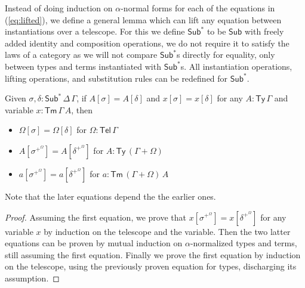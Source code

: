 \documentclass[sigplan,10pt,anonymous,review]{acmart}\settopmatter{printfolios=true,printccs=false,printacmref=false}
\newcommand{\Ty}{\mathsf{Ty}}
\newcommand{\Tm}{\mathsf{Tm}}
\newcommand{\Sub}{\mathsf{Sub}}
\newcommand{\Tel}{\mathsf{Tel}}
\begin{document}
Instead of doing induction on $\alpha$-normal forms for each of the equations in
(\ref{eq:lifted}), we define a general lemma which can lift any equation between
instantiations over a telescope. For this we define $\Sub^*$ to be $\Sub$ with
freely added identity and composition operations, we do not require it to
satisfy the laws of a category as we will not compare $\Sub^*$s directly for
equality, only between types and terms instantiated with $\Sub^*$s. All
instantiation operations, lifting operations, and substitution rules can be
redefined for $\Sub^*$.
\begin{lemma}
  \label{thm:lifting}
  Given $\sigma, \delta : \Sub^*\,\Delta\,\Gamma$, if $A[\sigma] =
  A[\delta]$ and $x[\sigma] = x[\delta]$ for any $A:\Ty\,\Gamma$ and variable
  $x:\Tm\,\Gamma\,A$, then
  \begin{itemize}
    \item $\Omega[\sigma] = \Omega[\delta]$ for $\Omega:\Tel\,\Gamma$
    \item $A[\sigma^{+^\Omega}] = A[\delta^{+^\Omega}]$ for $A:\Ty\,(\Gamma+\Omega)$
    \item $a[\sigma^{+^\Omega}] = a[\delta^{+^\Omega}]$ for $a:\Tm\,(\Gamma+\Omega)\,A$
  \end{itemize}
  Note that the later equations depend the the earlier ones.
\end{lemma}
\begin{proof}
  Assuming the first equation, we prove that $x[\sigma^{+^\Omega}] =
  x[\delta^{+^\Omega}]$ for any variable $x$ by induction on the telescope and
  the variable. Then the two latter equations can be proven by mutual induction
  on $\alpha$-normalized types and terms, still assuming the first equation.
  Finally we prove the first equation by induction on the telescope, using the
  previously proven equation for types, discharging its assumption.
\end{proof}
\end{document}
